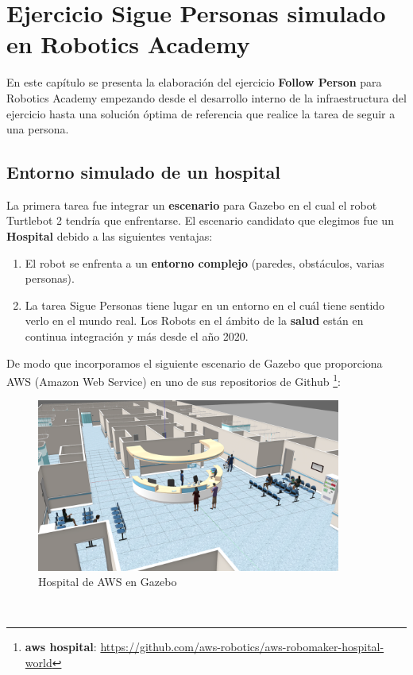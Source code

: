 \chapter{Ejercicio Sigue Personas simulado en Robotics Academy}
\label{cap:capitulo5}

En este capítulo se presenta la elaboración del ejercicio \textbf{Follow Person} para Robotics Academy empezando desde el desarrollo interno de la infraestructura del ejercicio hasta una solución óptima de referencia que realice la tarea de seguir a una persona.



\section{Entorno simulado de un hospital}
\label{sec:hospital_gazebo}

La primera tarea fue integrar un \textbf{escenario} para Gazebo en el cual el robot Turtlebot 2 tendría que enfrentarse. El escenario candidato que elegimos fue un \textbf{Hospital} debido a las siguientes ventajas:

\begin{enumerate}
	\item El robot se enfrenta a un \textbf{entorno complejo} (paredes, obstáculos, varias personas).
	\item La tarea Sigue Personas tiene lugar en un entorno en el cuál tiene sentido verlo en el mundo real. Los Robots en el ámbito de la \textbf{salud} están en continua integración y más desde el año 2020.
\end{enumerate}

De modo que incorporamos el siguiente escenario de Gazebo que proporciona AWS (Amazon Web Service) en uno de sus repositorios de Github \footnote{\textbf{aws hospital}: \url{https://github.com/aws-robotics/aws-robomaker-hospital-world}}:\\

\begin{figure} [H]
  \begin{center}
    \includegraphics[width=10cm]{imagenes/hospital_world.png}
  \end{center}
  \caption[Hospital de AWS en Gazebo]{Hospital de AWS en Gazebo}
  \label{fig:hospital_gazebo}
\end{figure}\

